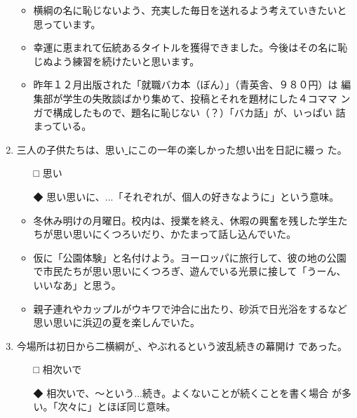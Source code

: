 \documentclass[
uplatex,
b5paper,
10pt,
dvipdfmx
]{jsbook}
\begin{document}
\begin{enumerate}
\begin{itemize}
 \item 横綱の名に恥じないよう、充実した毎日を送れるよう考えていきたいと
       思っています。
 \item 幸運に恵まれて伝統あるタイトルを獲得できました。今後はその名に恥
       じぬよう練習を続けたいと思います。
 \item 昨年１２月出版された「就職バカ本（ぼん）」（青英舎、９８０円）は
       編集部が学生の失敗談ばかり集めて、投稿とそれを題材にした４コママ
       ンガで構成したもので、題名に恥じない（？）「バカ話」が、いっぱい
       詰まっている。
\end{itemize}

 \item 三人の子供たちは、思い\underline{   }にこの一年の楽しかった想い出を日記に綴っ
       た。 

 \begin{itemize}
  \item[□] 思い
  \item[◆] 思い思いに、...「それぞれが、個人の好きなように」という意味。
 \end{itemize}

 \begin{itemize}
  \item 冬休み明けの月曜日。校内は、授業を終え、休暇の興奮を残した学生た
	ちが思い思いにくつろいだり、かたまって話し込んでいた。
  \item 仮に「公園体験」と名付けよう。ヨーロッパに旅行して、彼の地の公園
	で市民たちが思い思いにくつろぎ、遊んでいる光景に接して「うーん、
	いいなあ」と思う。
  \item 親子連れやカップルがウキワで沖合に出たり、砂浜で日光浴をするなど
	思い思いに浜辺の夏を楽しんでいた。
 \end{itemize}


 \item 今場所は初日から二横綱が\underline{   }、やぶれるという波乱続きの幕開け
       であった。 

 \begin{itemize}
  \item[□] 相次いで
  \item[◆] 相次いで、〜という...続き。よくないことが続くことを書く場合
	    が多い。「次々に」とほぼ同じ意味。
 \end{itemize}


\end{enumerate}
\end{document}
